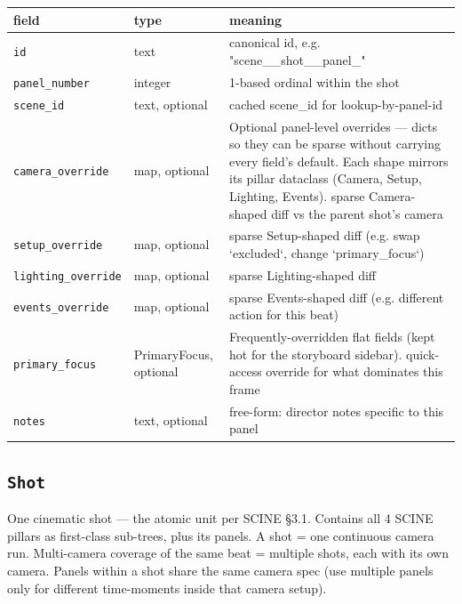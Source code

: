 \begin{longtable}{@{}R{0.24\textwidth}R{0.21\textwidth}R{0.49\textwidth}@{}}
\toprule \textbf{field} & \textbf{type} & \textbf{meaning} \\ \midrule
\endhead
\texttt{id} & text & canonical id, e.g. "scene\_\_\allowbreak shot\_\_\allowbreak panel\_" \\
\texttt{panel\_\allowbreak number} & integer & 1-based ordinal within the shot \\
\texttt{scene\_\allowbreak id} & text, optional & cached scene\_\allowbreak id for lookup-by-panel-id \\
\texttt{camera\_\allowbreak override} & map, optional & Optional panel-level overrides ---\allowbreak{} dicts so they can be sparse without carrying every field's default. Each shape mirrors its pillar dataclass (Camera, Setup, Lighting, Events). sparse Camera-shaped diff vs the parent shot's camera \\
\texttt{setup\_\allowbreak override} & map, optional & sparse Setup-shaped diff (e.g. swap `excluded`, change `primary\_\allowbreak focus`) \\
\texttt{lighting\_\allowbreak override} & map, optional & sparse Lighting-shaped diff \\
\texttt{events\_\allowbreak override} & map, optional & sparse Events-shaped diff (e.g. different action for this beat) \\
\texttt{primary\_\allowbreak focus} & PrimaryFocus, optional & Frequently-overridden flat fields (kept hot for the storyboard sidebar). quick-access override for what dominates this frame \\
\texttt{notes} & text, optional & free-form: director notes specific to this panel \\
\bottomrule
\end{longtable}

\subsection*{\texttt{Shot}}
\noindent One cinematic shot ---\allowbreak{} the atomic unit per SCINE \S{}3.1. Contains all 4 SCINE pillars as first-class sub-trees, plus its panels. A shot = one continuous camera run. Multi-camera coverage of the same beat = multiple shots, each with its own camera. Panels within a shot share the same camera spec (use multiple panels only for different time-moments inside that camera setup).

